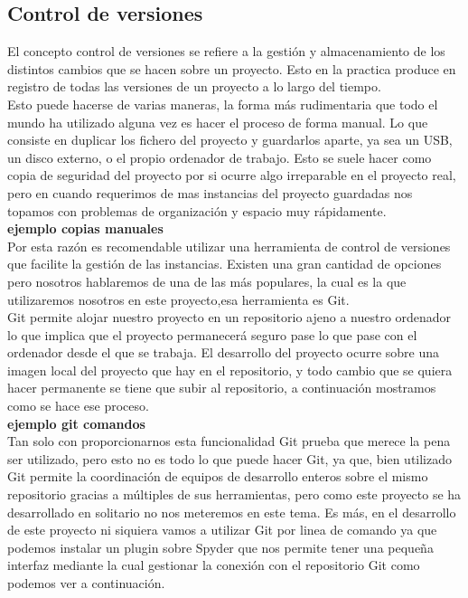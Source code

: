 \documentclass[12pt,a4paper]{article}
\begin{document}
	\subsection{Control de versiones}
	El concepto control de versiones se refiere a la gestión y almacenamiento de los distintos cambios que se hacen sobre un proyecto. Esto en la practica produce en registro de todas las versiones de un proyecto a lo largo del tiempo.\\
	Esto puede hacerse de varias maneras, la forma más rudimentaria que todo el mundo ha utilizado alguna vez es hacer el proceso de forma manual. Lo que consiste en duplicar los fichero del proyecto y guardarlos aparte, ya sea un USB, un disco externo, o el propio ordenador de trabajo. Esto se suele hacer como copia de seguridad del proyecto por si ocurre algo irreparable en el proyecto real, pero en cuando requerimos de mas instancias del proyecto guardadas nos topamos con problemas de organización y espacio muy rápidamente.\\
	\textbf{ejemplo copias manuales}\\	
	Por esta razón es recomendable utilizar una herramienta de control de versiones que facilite la gestión de las instancias. Existen una gran cantidad de opciones pero nosotros hablaremos de una de las más populares, la cual es la que utilizaremos nosotros en este proyecto,esa herramienta es Git.\\
	Git permite alojar nuestro proyecto en un repositorio ajeno a nuestro ordenador lo que implica que el proyecto permanecerá seguro pase lo que pase con el ordenador desde el que se trabaja. El desarrollo del proyecto ocurre sobre una imagen local del proyecto que hay en el repositorio, y todo cambio que se quiera hacer permanente se tiene que subir al repositorio, a continuación mostramos como se hace ese proceso.\\
	\textbf{ejemplo git comandos}\\
	Tan solo con proporcionarnos esta funcionalidad Git prueba que merece la pena ser utilizado, pero esto no es todo lo que puede hacer Git, ya que, bien utilizado Git permite la coordinación de equipos de desarrollo enteros sobre el mismo repositorio gracias a múltiples de sus herramientas, pero como este proyecto se ha desarrollado en solitario no nos meteremos en este tema. Es más, en el desarrollo de este proyecto ni siquiera vamos a utilizar Git por linea de comando ya que podemos instalar un plugin sobre Spyder que nos permite tener una pequeña interfaz mediante la cual gestionar la conexión con el repositorio Git como podemos ver a continuación.\\
\end{document}
